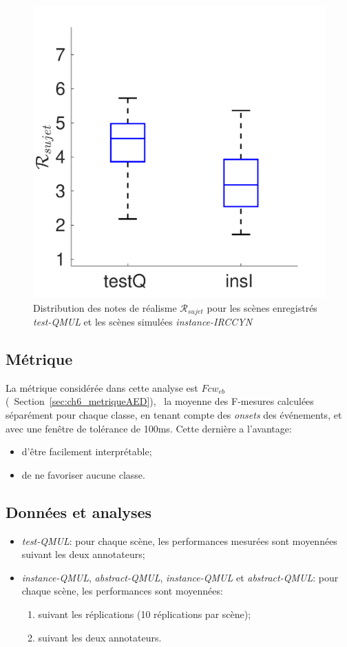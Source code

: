 \begin{figure}[t]
\begin{center}
\includegraphics[width=.33\textwidth]{gfx/ch_7/xp_realism_2}
\caption{Distribution des notes de réalisme $\mathcal{R}_{sujet}$ pour les scènes enregistrés \emph{test-QMUL} et les scènes simulées \emph{instance-IRCCYN}}
\label{fig:xpRealism} 
\end{center}
\end{figure}

\subsection{Métrique}

La métrique considérée dans cette analyse est $Fcw_{eb}$ (\cf~Section~\ref{sec:ch6_metriqueAED}), \ie~la moyenne des F-mesures calculées séparément pour chaque classe, en tenant compte des \emph{onsets} des événements, et avec une fenêtre de tolérance de 100ms. Cette dernière a l'avantage: 

\begin{itemize}
\item d'être facilement interprétable;
\item de ne favoriser aucune classe.
\end{itemize}

\subsection{Données et analyses}


\begin{itemize}

\item \emph{test-QMUL}: pour chaque scène, les performances mesurées sont moyennées suivant les deux annotateurs;
\item  \emph{instance-QMUL}, \emph{abstract-QMUL},  \emph{instance-QMUL} et \emph{abstract-QMUL}: pour chaque scène, les performances sont moyennées:

\begin{enumerate}
\item suivant les réplications (10 réplications par scène);
\item suivant les deux annotateurs.
\end{enumerate}

\end{itemize}

